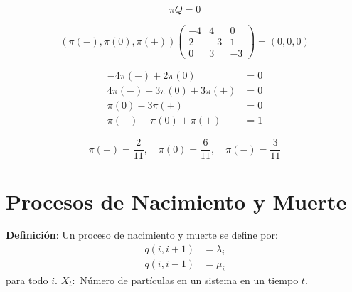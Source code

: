 \documentclass[12pt,a4paper]{article}
\newcommand{\definicion}[1]{%
\begin{definicionbox}
\textbf{Definición}: #1
\end{definicionbox}
}
\begin{document}
\begin{equation*}
\pi Q = 0
\end{equation*}

\begin{equation*}
(\pi(-), \pi(0), \pi(+)) \begin{pmatrix}
-4 & 4 & 0 \\
2 & -3 & 1 \\
0 & 3 & -3
\end{pmatrix} = (0, 0, 0)
\end{equation*}


\begin{align*}
-4\pi(-) + 2\pi(0) &= 0 \\
4\pi(-) - 3\pi(0) + 3\pi(+) &= 0 \\
\pi(0) - 3\pi(+) &= 0 \\
\pi(-) + \pi(0) + \pi(+) &= 1
\end{align*}

\begin{equation*}
\pi(+) = \frac{2}{11}, \quad \pi(0) = \frac{6}{11}, \quad \pi(-) = \frac{3}{11}
\end{equation*}


\section*{Procesos de Nacimiento y Muerte}

\definicion{Un proceso de nacimiento y muerte se define por:
\begin{align*}
q(i, i+1) &= \lambda_i \\
q(i, i-1) &= \mu_i
\end{align*}
para todo $i$. $X_t :$ Número de partículas en un sistema en un tiempo $t$.}
\end{document}
